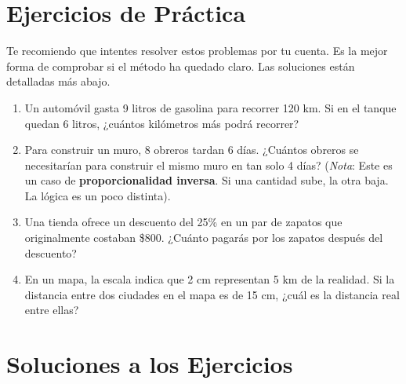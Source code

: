 \documentclass[12pt,a4paper]{article}
\begin{document}
\newpage

\section{Ejercicios de Pr\'{a}ctica}

Te recomiendo que intentes resolver estos problemas por tu cuenta. Es la mejor forma de comprobar si el m\'{e}todo ha quedado claro. Las soluciones est\'{a}n detalladas m\'{a}s abajo.

\begin{enumerate}
    \item Un autom\'{o}vil gasta 9 litros de gasolina para recorrer 120 km. Si en el tanque quedan 6 litros, ¿cu\'{a}ntos kil\'{o}metros m\'{a}s podr\'{a} recorrer?

    \item Para construir un muro, 8 obreros tardan 6 d\'{i}as. ¿Cu\'{a}ntos obreros se necesitar\'{i}an para construir el mismo muro en tan solo 4 d\'{i}as? (\textit{Nota}: Este es un caso de \textbf{proporcionalidad inversa}. Si una cantidad sube, la otra baja. La l\'{o}gica es un poco distinta).

    \item Una tienda ofrece un descuento del 25\% en un par de zapatos que originalmente costaban \$800. ¿Cu\'{a}nto pagar\'{a}s por los zapatos despu\'{e}s del descuento?

    \item En un mapa, la escala indica que 2 cm representan 5 km de la realidad. Si la distancia entre dos ciudades en el mapa es de 15 cm, ¿cu\'{a}l es la distancia real entre ellas?
\end{enumerate}

\section*{Soluciones a los Ejercicios}
\end{document}

